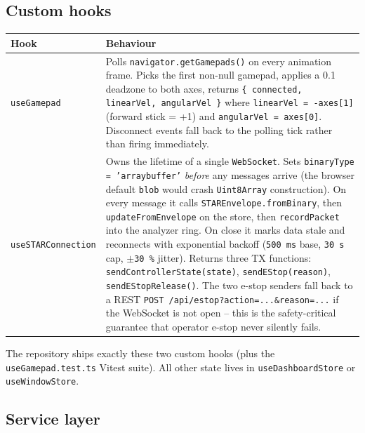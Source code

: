 \subsection{Custom hooks}

\begin{center}
\begin{tabular}{|p{3.4cm}|p{11.4cm}|}
\hline
\textbf{Hook}                  & \textbf{Behaviour}                                                                                                                        \\
\hline
\texttt{useGamepad}            & Polls \texttt{navigator.getGamepads()} on every animation frame. Picks the first non-null gamepad, applies a 0.1 deadzone to both axes, returns \texttt{\{ connected, linearVel, angularVel \}} where \texttt{linearVel = -axes[1]} (forward stick = +1) and \texttt{angularVel = axes[0]}. Disconnect events fall back to the polling tick rather than firing immediately. \\
\texttt{useSTARConnection}     & Owns the lifetime of a single \texttt{WebSocket}. Sets \texttt{binaryType = 'arraybuffer'} \emph{before} any messages arrive (the browser default \texttt{blob} would crash \texttt{Uint8Array} construction). On every message it calls \texttt{STAREnvelope.fromBinary}, then \texttt{updateFromEnvelope} on the store, then \texttt{recordPacket} into the analyzer ring. On close it marks data stale and reconnects with exponential backoff (\texttt{500\,ms} base, \texttt{30\,s} cap, \texttt{$\pm$30\,\%} jitter). Returns three TX functions: \texttt{sendControllerState(state)}, \texttt{sendEStop(reason)}, \texttt{sendEStopRelease()}. The two e-stop senders fall back to a REST \texttt{POST /api/estop?action=...\&reason=...} if the WebSocket is not open -- this is the safety-critical guarantee that operator e-stop never silently fails. \\
\hline
\end{tabular}
\end{center}

The repository ships exactly these two custom hooks (plus the
\texttt{useGamepad.test.ts} Vitest suite). All other state lives in
\texttt{useDashboardStore} or \texttt{useWindowStore}.

\subsection{Service layer}

